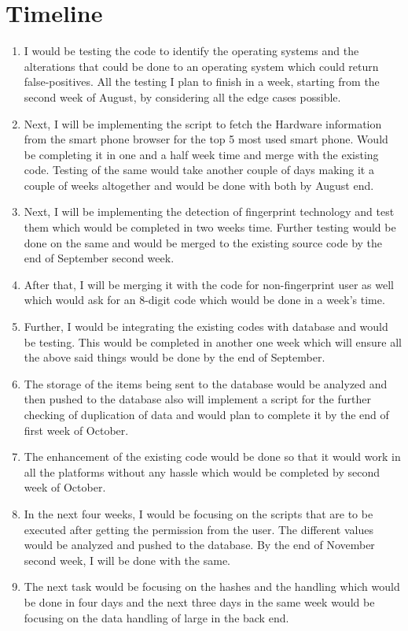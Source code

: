 \documentclass[journal]{IEEEtran}
\begin{document}
\section{Timeline}
\begin{enumerate}
\item I would be testing the code to identify the operating systems and the alterations that could be done to an operating system which could return false-positives. All the testing I plan to finish in a week, starting from the second week of August, by considering all the edge cases possible. 
\item Next, I will be implementing the script to fetch the Hardware information from the smart phone browser for the top 5 most used smart phone. Would be completing it in one and a half week time and merge with the existing code. Testing of the same would take another couple of days making it a couple of weeks altogether and would be done with both by August end.  
\item Next, I will be implementing the detection of fingerprint technology and test them which would be completed in two weeks time. Further testing would be done on the same and would be merged to the existing source code by the end of September second week.
\item After that, I will be merging it with the code for non-fingerprint user as well which would ask for an 8-digit code which would be done in a week's time. 
\item Further, I would be integrating the existing codes with database and would be testing. This would be completed in another one week which will ensure all the above said things would be done by the end of September.
\item The storage of the items being sent to the database would be analyzed and then pushed to the database also will implement a script for the further checking of duplication of data and would plan to complete it by the end of first week of October. 
\item The enhancement of the existing code would be done so that it would work in all the platforms without any hassle which would be completed by second week of October.
\item In the next four weeks, I would be focusing on the scripts that are to be executed after getting the permission from the user. The different values would be analyzed and pushed to the database. By the end of November second week, I will be done with the same. 
\item The next task would be focusing on the hashes and the handling which would be done in four days and the next three days in the same week would be focusing on the data handling of large in the back end. 

\end{enumerate}
\end{document}
